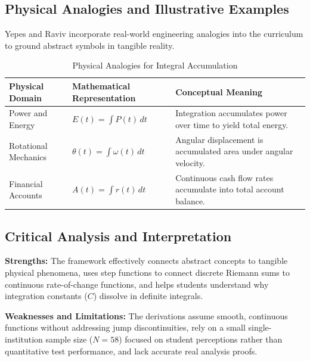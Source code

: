 \documentclass[11pt, a4paper]{article}
\begin{document}
\subsection{Physical Analogies and Illustrative Examples}
Yepes and Raviv \cite{Yepes2024} incorporate real-world engineering analogies into the curriculum to ground abstract symbols in tangible reality.

\begin{table}[h!]
\centering
\caption{Physical Analogies for Integral Accumulation}
\label{tab:physical_analogies}
\vspace{0.5em}
\begin{tabular}{@{} p{3cm} p{4.5cm} p{6.5cm} @{}}
\toprule
\textbf{Physical Domain} & \textbf{Mathematical Representation} & \textbf{Conceptual Meaning} \\ \midrule
Power and Energy & $E(t) = \int P(t) \, dt$ & Integration accumulates power over time to yield total energy. \\ \addlinespace
Rotational Mechanics & $\theta(t) = \int \omega(t) \, dt$ & Angular displacement is accumulated area under angular velocity. \\ \addlinespace
Financial Accounts & $A(t) = \int r(t) \, dt$ & Continuous cash flow rates accumulate into total account balance. \\ \bottomrule
\end{tabular}
\end{table}

\subsection{Critical Analysis and Interpretation}
\label{subsec:critical_analysis}
\textbf{Strengths:} The framework effectively connects abstract concepts to tangible physical phenomena, uses step functions to connect discrete Riemann sums to continuous rate-of-change functions, and helps students understand why integration constants ($C$) dissolve in definite integrals.

\vspace{0.5em}
\noindent \textbf{Weaknesses and Limitations:} The derivations assume smooth, continuous functions without addressing jump discontinuities, rely on a small single-institution sample size ($N=58$) focused on student perceptions rather than quantitative test performance, and lack accurate real analysis proofs.
\end{document}
